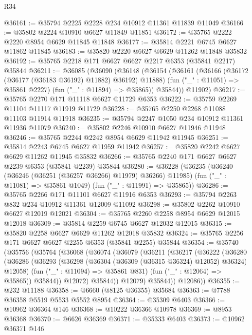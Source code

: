 \begin{lexlean}{R34}
\begin{coremodule}
@36161 := @35794 @2225 @2228 @234 @10912 @11361 @11839 @11049
@36166 := @35802 @2224 @10910 @6627 @11849 @11851
@36172 := @35765 @2222 @2220 @8954 @6629 @11845 @11848
@36177 := @35814 @2221 @6745 @6627 @11862 @11845
@36183 := @35820 @2220 @6627 @6629 @11262 @11848 @35832
@36192 := @35765 @2218 @171 @6627 @6627 @2217 @6353 (@35841 @2217) @35844
@36211 := @36085
    (@36090
      (@36148
        (@36154
          (@36161
            (@36166 (@36172 (@36177 (@36183 @36192) @11882) @36192) @11888)
            (fun ("_" : @11051) => @35861 @2227)
            (fun ("_" : @11894) => @35865))
          @35844))
      @11902)
@36217 := @35765 @2270 @171 @11118 @6627 @11729 @6353
@36222 := @35759 @2269 @11104 @11117 @11919 @11729
@36228 := @35765 @2250 @2268 @11088 @11103 @11914 @11918
@36235 := @35794 @2247 @1050 @234 @10912 @11361 @11936 @11079
@36240 := @35802 @2246 @10910 @6627 @11946 @11948
@36246 := @35765 @2244 @2242 @8954 @6629 @11942 @11945
@36251 := @35814 @2243 @6745 @6627 @11959 @11942
@36257 := @35820 @2242 @6627 @6629 @11262 @11945 @35832
@36266 := @35765 @2240 @171 @6627 @6627 @2239 @6353 (@35841 @2239) @35844
@36280 := @36228
    (@36235
      (@36240 (@36246 (@36251 (@36257 @36266) @11979) @36266) @11985)
      (fun ("_" : @11081) => @35861 @1049)
      (fun ("_" : @11991) => @35865))
@36286 := @35765 @2266 @171 @11101 @6627 @11916 @6353
@36293 := @35794 @2263 @832 @234 @10912 @11361 @12009 @11092
@36298 := @35802 @2262 @10910 @6627 @12019 @12021
@36304 := @35765 @2260 @2258 @8954 @6629 @12015 @12018
@36309 := @35814 @2259 @6745 @6627 @12032 @12015
@36315 := @35820 @2258 @6627 @6629 @11262 @12018 @35832
@36324 := @35765 @2256 @171 @6627 @6627 @2255 @6353 (@35841 @2255) @35844
@36354 := @35740
    (@35756
      (@35764
        (@36068
          (@36074
            (@36079
              (@36211
                (@36217
                  (@36222
                    (@36280
                      (@36286
                        (@36293
                          (@36298 (@36304 (@36309 (@36315 @36324) @12052) @36324) @12058)
                          (fun ("_" : @11094) => @35861 @831)
                          (fun ("_" : @12064) => @35865))
                        @35844))
                    @12072)
                  @35844))
              @12079)
            @35844))
        @12086))
@36355 := @232 @11188
@36358 := @6660 (@8125 @36355) @35684
@36363 := @7788 @36358 @5519 @5533 @5552 @8954
@36364 := @35309 @6403
@36366 := @10962 @36364 @146
@36368 := @10222 @36366 @10978
@36369 := @8953 @36368
@36370 := @6626 @36369
@36371 := @35333 @6403
@36373 := @10962 @36371 @146

\end{coremodule}
\end{lexlean}
